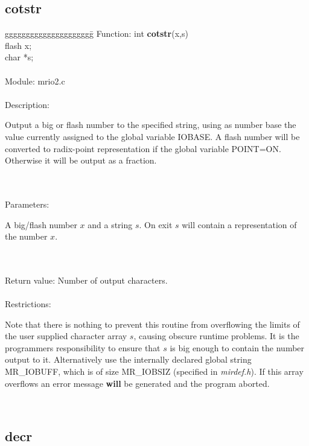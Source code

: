 \subsection{cotstr}
\begin{tabbing}
ggggggggggggggggggggg\= \kill
      Function:      \>int {\bf cotstr}(x,s) \\
                     \>flash x; \\
                     \>char *s; \\
      \ \\
      Module:        \>mrio2.c \\
      \ \\
      Description:   \>
                     \parbox[t]{3in}
                     {Output a big or flash number to the specified string,
                     using as number base the value currently assigned to the
                     global variable IOBASE. A flash number will be converted
                     to radix-point representation if the global variable
                     POINT=ON. Otherwise it will be output as a fraction.}  \\
      \ \\
      Parameters:    \>
                     \parbox[t]{3 in}
                     {A big/flash number $x$ and a string $s$. On exit $s$ 
                      will contain a representation of the number $x$.} \\
      \ \\
      Return value:  \>Number of output characters.\\
      \ \\
      Restrictions:  \>
                     \parbox[t]{3 in}
                     {Note that there is nothing to prevent this routine from
                      overflowing the limits of the user supplied character 
                      array $s$, causing obscure runtime problems. It is the 
                      programmers responsibility to
                      ensure that $s$ is big enough to contain the number 
                      output to it. Alternatively use the internally declared 
                      global string MR\_IOBUFF, which is of size MR\_IOBSIZ 
                      (specified in {\em mirdef.h}). If this array overflows 
                      an error message {\bf will} be generated and the program 
                      aborted.} \\
\end{tabbing}

\pagebreak
\subsection{decr}

